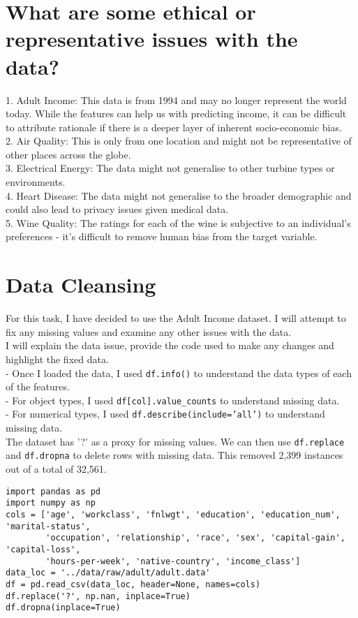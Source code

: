 \documentclass[11pt]{article}
\begin{document}
\section{What are some ethical or representative issues with the data?}
1. Adult Income: This data is from 1994 and may no longer represent the world today. While the features can help us with predicting income, it can be difficult to attribute rationale if there is a deeper layer of inherent socio-economic bias. \\
2. Air Quality: This is only from one location and might not be representative of other places across the globe. \\
3. Electrical Energy: The data might not generalise to other turbine types or environments. \\
4. Heart Disease: The data might not generalise to the broader demographic and could also lead to privacy issues given medical data. \\
5. Wine Quality: The ratings for each of the wine is subjective to an individual's preferences - it's difficult to remove human bias from the target variable.

\section{Data Cleansing}
For this task, I have decided to use the Adult Income dataset. I will attempt to fix any missing values and examine any other issues with the data. \\
I will explain the data issue, provide the code used to make any changes and highlight the fixed data. \\
- Once I loaded the data, I used \texttt{df.info()} to understand the data types of each of the features. \\
- For object types, I used \texttt{df[col].value\_counts} to understand missing data. \\
- For numerical types, I used \texttt{df.describe(include='all')} to understand missing data. \\
The dataset has '?' as a proxy for missing values. We can then use \texttt{df.replace} and \texttt{df.dropna} to delete rows with missing data. This removed 2,399 instances out of a total of 32,561. 

\begin{lstlisting}[caption={Cleaning Adult Income dataset}, label={lst:cleaning}]
import pandas as pd
import numpy as np
cols = ['age', 'workclass', 'fnlwgt', 'education', 'education_num', 'marital-status', 
        'occupation', 'relationship', 'race', 'sex', 'capital-gain', 'capital-loss', 
        'hours-per-week', 'native-country', 'income_class']
data_loc = '../data/raw/adult/adult.data'
df = pd.read_csv(data_loc, header=None, names=cols)
df.replace('?', np.nan, inplace=True)
df.dropna(inplace=True)
\end{lstlisting}
\end{document}
